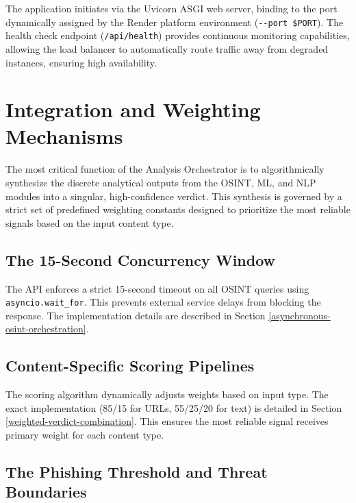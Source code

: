 The application initiates via the Uvicorn ASGI web server, binding to
the port dynamically assigned by the Render platform environment
(\texttt{-\/-port\ \$PORT}). The health check endpoint
(\texttt{/api/health}) provides continuous monitoring capabilities,
allowing the load balancer to automatically route traffic away from
degraded instances, ensuring high availability.


\section{Integration and Weighting
Mechanisms}\label{integration-and-weighting-mechanisms}

The most critical function of the Analysis Orchestrator is to
algorithmically synthesize the discrete analytical outputs from the
OSINT, ML, and NLP modules into a singular, high-confidence verdict.
This synthesis is governed by a strict set of predefined weighting
constants designed to prioritize the most reliable signals based on the
input content type.

\subsection{The 15-Second Concurrency
Window}\label{the-15-second-concurrency-window}

The API enforces a strict 15-second timeout on all OSINT queries using \texttt{asyncio.wait\_for}. This prevents external service delays from blocking the response. The implementation details are described in Section \ref{asynchronous-osint-orchestration}.

\subsection{Content-Specific Scoring
Pipelines}\label{content-specific-scoring-pipelines}

The scoring algorithm dynamically adjusts weights based on input type. The exact implementation (85/15 for URLs, 55/25/20 for text) is detailed in Section \ref{weighted-verdict-combination}. This ensures the most reliable signal receives primary weight for each content type.

\subsection{The Phishing Threshold and Threat
Boundaries}\label{the-phishing-threshold-and-threat-boundaries}

